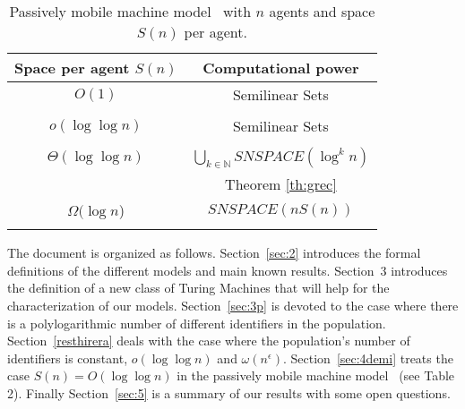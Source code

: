 \documentclass[UKenglish]{llncs}
\begin{document}
\begin{table}
\vspace{-1.5cm}
\begin{center}
\begin{tabular}{c|c}
Space per agent $S(n)$ & Computational power \\\hline
 $O(1)$  & Semilinear Sets  \\
                      &  \cite{angluin2007cpp,AspnesADFP2004}  \\  \hline
$o(\log\log n)$    &  Semilinear Sets  \\
                                             &
              \cite{chatzigiannakis2011passively} \\ \hline
   $\Theta(\log\log n)$    &  $\bigcup_{k \in \mathbb{N}}SNSPACE(\log^k n)$  \\
                                     &  Theorem \ref{th:grec}\\ \hline
$\Omega(\log n$) & $SNSPACE(nS(n))$ \\
   &    \cite{chatzigiannakis2011passively} \\
\end{tabular}
\end{center}
      \caption{Passively mobile
machine model~\cite{chatzigiannakis2011passively}
with $n$ agents and space $S(n)$ per agent.}
\label{tab:Chatzigiannakis}

 \end{table}


 

The document is organized as follows. Section~\ref{sec:2} introduces the formal definitions of the different
models and main known results. 
Section~3 introduces the definition of a new class of Turing Machines that will
help for the characterization of our models.
Section~\ref{sec:3p} is devoted to the case where there is
a polylogarithmic number of different identifiers in the population.
Section~\ref{resthirera} deals with the case where the population's number of identifiers is constant,
$o(\log\log n)$ and $\omega(n^{\epsilon})$. 
Section~\ref{sec:4demi} treats the case $S(n)=O(\log\log n)$ in the
passively mobile machine model~\cite{chatzigiannakis2011passively} (see Table 2).
Finally Section~\ref{sec:5} is  a summary of our results with some open questions. 
\end{document}
